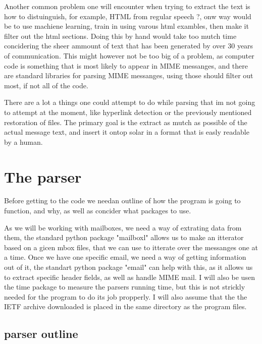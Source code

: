 \documentclass{report}
\begin{document}
Another common problem one will encounter when trying to extract the text is how to distuinguish, for example, HTML from regular speech ?, onw way would be to use machiene learning, train in using varous html exambles, then make it filter out the html sections.
Doing this by hand would take too mutch time concidering the sheer ammount of text that has been generated by over 30 years of communication. This might however not be too big of a problem, as computer code is something that is most likely to appear in MIME messanges,
and there are standard libraries for parsing MIME messanges, using those should filter out most, if not all of the code.

There are a lot a things one could attempt to do while parsing that im not going to attempt at the moment, like hyperlink detection or the previously mentioned restoration of files. The primary goal is the extract as mutch as possible of the actual message text, and insert it ontop solar in a format that is easly readable by a human. 

\section{The parser}
Before getting to the code we needan outline of how the program is going to function, and why, as well as concider what packages to use.

As we will be working with mailboxes, we need a way of extrating data from them, the standard python package "mailboxl" allows us to make an itterator based on a gicen mbox files, that we can use to itterate over the messanges one at a time.
Once we have one specific email, we need a way of getting information out of it, the standart python package "email" can help with this, as it allows us to extract specific header fields, as well as handle MIME mail.
I will also be usen the time package to measure the parsers running time, but this is not strickly needed for the program to do its job propperly.
I will also assume that the the IETF archive downloaded is placed in the same directory as the program files.

\subsection{parser outline}
\end{document}

